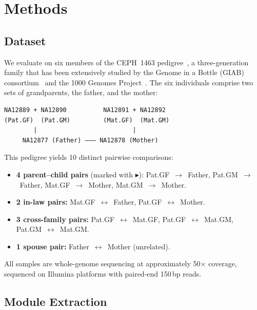 \documentclass{../yalumba}
\begin{document}
\section{Methods}
\label{sec:methods}

\subsection{Dataset}
\label{sec:methods-dataset}

We evaluate on six members of the CEPH~1463 pedigree~\cite{ceph1463},
a three-generation family that has been extensively studied by the Genome
in a Bottle (GIAB) consortium~\cite{zook2019giab} and the 1000 Genomes
Project~\cite{1000genomes2015}.  The six individuals comprise two sets of
grandparents, the father, and the mother:

\begin{pedigree}
\begin{verbatim}
NA12889 + NA12890          NA12891 + NA12892
(Pat.GF)  (Pat.GM)         (Mat.GF)  (Mat.GM)
        |                          |
     NA12877 (Father) ——— NA12878 (Mother)
\end{verbatim}
\end{pedigree}

\noindent This pedigree yields 10 distinct pairwise comparisons:

\begin{itemize}
  \item \textbf{4 parent--child pairs} (marked with $\blacktriangleright$):
    Pat.GF~$\to$~Father, Pat.GM~$\to$~Father,
    Mat.GF~$\to$~Mother, Mat.GM~$\to$~Mother.
  \item \textbf{2 in-law pairs:}
    Mat.GF~$\leftrightarrow$~Father, Pat.GF~$\leftrightarrow$~Mother.
  \item \textbf{3 cross-family pairs:}
    Pat.GF~$\leftrightarrow$~Mat.GF,
    Pat.GF~$\leftrightarrow$~Mat.GM,
    Pat.GM~$\leftrightarrow$~Mat.GM.
  \item \textbf{1 spouse pair:}
    Father~$\leftrightarrow$~Mother (unrelated).
\end{itemize}

All samples are whole-genome sequencing at approximately 50$\times$ coverage,
sequenced on Illumina platforms with paired-end 150\,bp reads.

\subsection{Module Extraction}
\label{sec:methods-modules}
\end{document}
